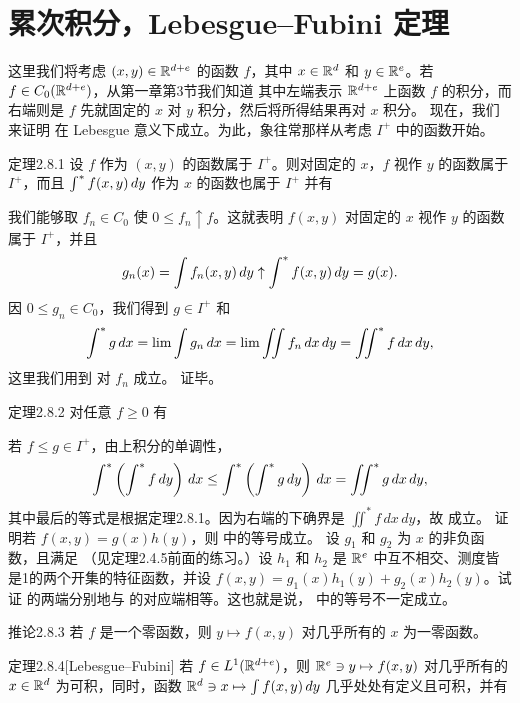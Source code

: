 \section{累次积分，Lebesgue--Fubini 定理}
这里我们将考虑 $(x,y)\in\mathbb R^{d+e}$ 的函数 $f$，其中 $x\in\mathbb R^d$ 和 $y\in\mathbb R^e$。若 $f\in C_0(\mathbb R^{d+e})$，从第一章第3节我们知道
其中左端表示 $\mathbb R^{d+e}$ 上函数 $f$ 的积分，而右端则是 $f$ 先就固定的 $x$ 对 $y$ 积分，然后将所得结果再对 $x$ 积分。
现在，我们来证明  在 Lebesgue 意义下成立。为此，象往常那样从考虑 $I^+$ 中的函数开始。
\begin{statement}{定理}{2.8.1}
设 $f$ 作为 $(x,y)$ 的函数属于 $I^+$。则对固定的 $x$，$f$ 视作 $y$ 的函数属于 $I^+$，而且 $\int^{*} f(x,y)\,dy$ 作为 $x$ 的函数也属于 $I^+$ 并有
\end{statement}
\Proof 我们能够取 $f_n\in C_0$ 使 $0\le f_n\uparrow f$。这就表明 $f(x,y)$ 对固定的 $x$ 视作 $y$ 的函数属于 $I^+$，并且
\[g_n(x)=\int f_n(x,y)\,dy\uparrow\int^{*} f(x,y)\,dy=g(x).\]
因 $0\le g_n\in C_0$，我们得到 $g\in I^+$ 和
\[\int^{*} g\,dx=\lim\int g_n\,dx=\lim\iint f_n\,dx\,dy=\iint^{*}f\,dx\,dy,\]
这里我们用到  对 $f_n$ 成立。 证毕。
\begin{statement}{定理}{2.8.2}
对任意 $f\ge0$ 有
\end{statement}
\Proof 若 $f\le g\in I^+$，由上积分的单调性，
\[\int^{*}\left(\int^{*} f\,dy\right)\,dx\le\int^{*}\left(\int^{*} g\,dy\right)\,dx=\iint^*g\,dx\,dy,\]
其中最后的等式是根据定理2.8.1。因为右端的下确界是 $\iint^* f\,dx\,dy$，故  成立。
\Exercise 证明若 $f(x,y)=g(x)h(y)$，则  中的等号成立。
\Exercise 设 $g_1$ 和 $g_2$ 为 $x$ 的非负函数，且满足
（见定理2.4.5前面的练习。）设 $h_1$ 和 $h_2$ 是 $\mathbb R^e$ 中互不相交、测度皆是1的两个开集的特征函数，并设 $f(x,y)=g_1(x)h_1(y)+g_2(x)h_2(y)$。试证  的两端分别地与  的对应端相等。这也就是说， 中的等号不一定成立。
\begin{statement}{推论}{2.8.3}
若 $f$ 是一个零函数，则 $y\mapsto f(x,y)$ 对几乎所有的 $x$ 为一零函数。
\end{statement}
\begin{statement}{定理}{2.8.4}[Lebesgue--Fubini]
若 $f\in L^1(\mathbb R^{d+e})$，则 $\mathbb R^e\ni y\mapsto f(x,y)$ 对几乎所有的 $x\in\mathbb R^d$ 为可积，同时，函数 $\mathbb R^d\ni x\mapsto\int f(x,y)\,dy$ 几乎处处有定义且可积，并有
\end{statement}
